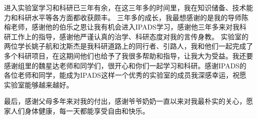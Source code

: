 
\begin{acknowledgements}
进入实验室学习和科研已三年有余，在这三年多的时间里，我在知识储备、技术能力和科研水平等各方面都收获颇丰。
三年多的成长，我最想感谢的是我的导师陈榕老师，感谢他的伯乐之恩让我有机会进入IPADS学习，感谢他三年多来对我科研工作上的指导，感谢他严谨认真的治学、科研态度对我的言传身教。
实验室的两位学长姚子航和沈斯杰是我科研道路上的同行者、引路人，我和他们一起完成了多个科研项目，在这期间他们也给予了我很多帮助和指导，让我大为受益。我还要感谢组里的魏星达老师和同学们，很开心和你们一起学习和科研。感谢IPADS的各位老师和同学，能成为IPADS这样一个优秀的实验室的成员我深感幸运，祝愿实验室能够越来越好。

最后，感谢父母多年来对我的付出，感谢爷爷奶奶一直以来对我最朴实的关心，愿家人们身体健康，每一天都能享受自由和快乐。
\end{acknowledgements}

